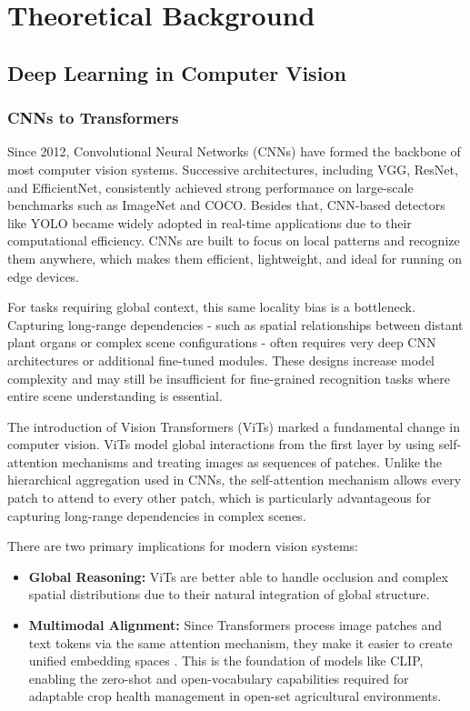 \chapter{Theoretical Background}
\label{chap:theory}
\thispagestyle{open}

\section{Deep Learning in Computer Vision}
\subsection{CNNs to Transformers}
Since 2012, Convolutional Neural Networks (CNNs) have formed the backbone of most computer vision systems. Successive architectures, including VGG\cite{simonyan2014vgg}, ResNet\cite{he2016resnet}, and EfficientNet\cite{tan2019efficientnet}, consistently achieved strong performance on large-scale benchmarks such as ImageNet\cite{russakovsky2015ilsvrc} and COCO\cite{lin2014coco}. Besides that, CNN-based detectors like YOLO\cite{redmon2016yolo} became widely adopted in real-time applications due to their computational efficiency. CNNs are built to focus on local patterns and recognize them anywhere, which makes them efficient, lightweight, and ideal for running on edge devices.

For tasks requiring global context, this same locality bias is a bottleneck. Capturing long-range dependencies - such as spatial relationships between distant plant organs or complex scene configurations - often requires very deep CNN architectures or additional fine-tuned modules. These designs increase model complexity and may still be insufficient for fine-grained recognition tasks where entire scene understanding is essential.

The introduction of Vision Transformers (ViTs)\cite{dosovitskiy2021vit} marked a fundamental change in computer vision. ViTs model global interactions from the first layer by using self-attention mechanisms and treating images as sequences of patches. Unlike the hierarchical aggregation used in CNNs, the self-attention mechanism allows every patch to attend to every other patch, which is particularly advantageous for capturing long-range dependencies in complex scenes.

There are two primary implications for modern vision systems: \begin{itemize} 
	\item \textbf{Global Reasoning:} ViTs are better able to handle occlusion and complex spatial distributions due to their natural integration of global structure.
	\item \textbf{Multimodal Alignment:} Since Transformers process image patches and text tokens via the same attention mechanism, they make it easier to create unified embedding spaces . This is the foundation of models like CLIP, enabling the zero-shot and open-vocabulary capabilities required for adaptable crop health management in open-set agricultural environments.
\end{itemize}

